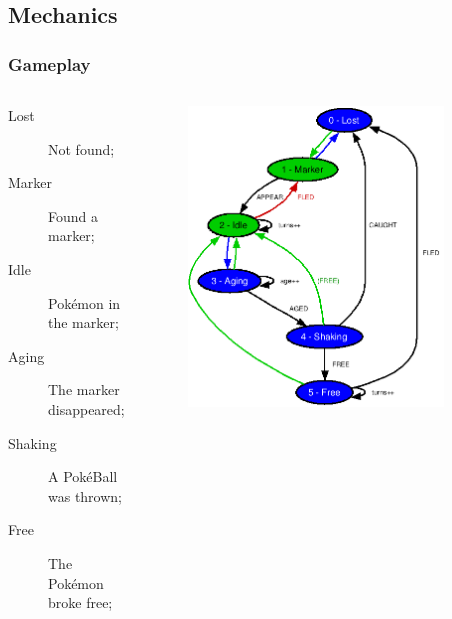 \documentclass{beamer}
\begin{document}
\subsection{Mechanics}
\begin{frame}
	\frametitle{Gameplay}
	\begin{columns}
		\begin{column}{0.5\linewidth}
			\begin{description}
				\item[Lost]{Not found;}
				\item[Marker]{Found a marker;}
				\item[Idle]{Pokémon in the marker;}
				\item[Aging]{The marker disappeared;}
				\item[Shaking]{A PokéBall was thrown;}
				\item[Free]{The Pokémon broke free;}
			\end{description}
		\end{column}
		\begin{column}{0.5\linewidth}
			\begin{figure}
				\begin{center}
					\includegraphics[width=0.9\textwidth]{slides/images/marker.png}
				\end{center}
			\end{figure}
		\end{column}
	\end{columns}
\end{frame}
\end{document}
